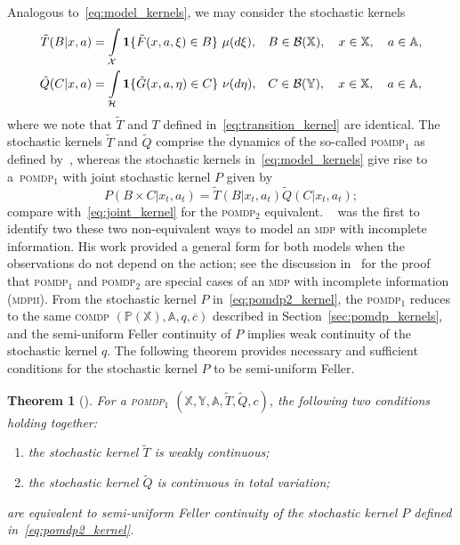 \documentclass[11pt,onecolumn]{IEEEtran}  %
\newcommand{\Ab}{\mathbb{A}}
\newcommand{\Pb}{\mathbb{P}}
\newcommand{\Xb}{\mathbb{X}}
\newcommand{\Yb}{\mathbb{Y}}
\newcommand{\Bc}{\mathcal{B}}
\newcommand{\Xc}{\mathcal{X}}
\newcommand{\Hc}{\mathcal{H}}
\renewcommand{\bar}{\overline}
\newcommand{\one}[1]{\mathbf{1}\set{#1}}
\newcommand{\mdp}{\textsc{mdp}}
\newcommand{\mdpii}{\textsc{mdpii}}
\newcommand{\pomdp}{\textsc{pomdp}}
\newcommand{\pomdpOne}{\pomdp{}${}_{1}$}
\newcommand{\pomdpTwo}{\pomdp{}${}_{2}$}
\newcommand{\comdp}{\textsc{comdp}}
\DeclarePairedDelimiter{\set}{\{}{\}}
\newtheorem{theorem}{Theorem}
\theoremstyle{definition}
\begin{document}
Analogous to~\eqref{eq:model_kernels}, we may consider the stochastic kernels
\begin{subequations}
    \label{eq:model_kernels_pomdp1}
    \begin{align}
    \tilde{T}(B|x, a) &= \int\limits_{\Xc} \one{\tilde{F}(x, a, \xi) \in B} \ \mu(d\xi), && B \in \Bc (\Xb), \quad x \in \Xb, \quad a \in \Ab, \label{eq:transition_kernel_pomdp1} \\
    \tilde{Q}(C|x, a) & =\int\limits_{\Hc}\one{\tilde{G}(x, a, \eta) \in C} \ \nu(d\eta),
    && C \in \Bc (\Yb), \quad x \in \Xb, \quad a \in \Ab,  \label{eq:observation_kernel_pomdp1}
    \end{align}
\end{subequations}
where we note that $\tilde{T}$ and $T$ defined in~\eqref{eq:transition_kernel} are identical. The stochastic kernels $\tilde{T}$ and $\tilde{Q}$ comprise the dynamics of the so-called \pomdpOne{} as defined by~\citet{feinberg_markov_2022}, whereas the stochastic kernels in~\eqref{eq:model_kernels} give rise to a~\pomdpOne{} with  joint stochastic kernel $P$ given by
\begin{equation} \label{eq:pomdp2_kernel}
    P(B\times C|x_t, a_t) = \tilde{T}(B|x_t,a_t) \tilde{Q}(C|x_t,a_t);
\end{equation}
compare with~\eqref{eq:joint_kernel} for the \pomdpTwo{} equivalent. ~\citet{platzman_1980} was the first to identify two these two non-equivalent ways to model an \mdp{} with incomplete information. His work provided a general form for both models when the observations do not depend on the action; see the discussion in~\citet[Section 3]{feinberg_markov_2022} for the proof that \pomdpOne{} and \pomdpTwo{} are special cases of an \mdp{} with incomplete information (\mdpii{}). From the stochastic kernel $P$ in~\eqref{eq:pomdp2_kernel}, the \pomdpOne{} reduces to the same \comdp{} $(\Pb(\Xb),\Ab, q, \bar{c})$ described in Section~\ref{sec:pomdp_kernels}, and the semi-uniform Feller continuity of $P$ implies weak continuity of the stochastic kernel $q$. The following theorem provides necessary and sufficient conditions for the stochastic kernel $P$ to be semi-uniform Feller.

\begin{theorem}[{\citet[Corollary 6.10]{feinberg_markov_2022}}] \label{thm:pomdp1_results}
    For a \pomdpOne{} $(\Xb, \Yb, \Ab, \tilde{T}, \tilde{Q}, c)$, the following two conditions holding together:
    \begin{enumerate}
        \item the stochastic kernel $\tilde{T}$ is weakly continuous;
        \item the stochastic kernel $\tilde{Q}$ is continuous in total variation;
    \end{enumerate}
    are equivalent to semi-uniform Feller continuity of the stochastic kernel $P$ defined in~\eqref{eq:pomdp2_kernel}.
\end{theorem}
\end{document}
